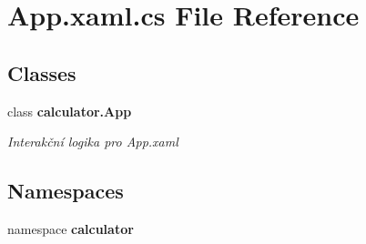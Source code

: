 \section{App.\+xaml.\+cs File Reference}
\label{_app_8xaml_8cs}
\subsection*{Classes}
\begin{DoxyCompactItemize}
\item 
class \textbf{ calculator.\+App}
\begin{DoxyCompactList}\small\item\em Interakční logika pro App.\+xaml \end{DoxyCompactList}\end{DoxyCompactItemize}
\subsection*{Namespaces}
\begin{DoxyCompactItemize}
\item 
namespace \textbf{ calculator}
\end{DoxyCompactItemize}
